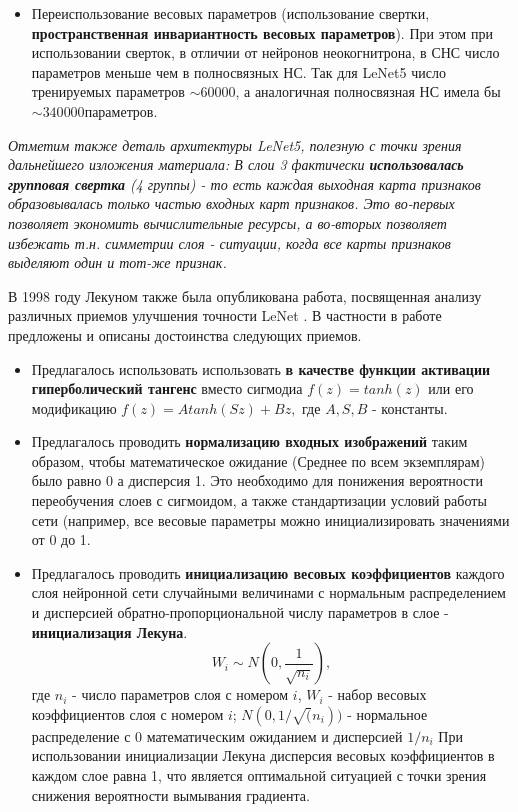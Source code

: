 \documentclass[12pt]{article}
\begin{document}
\begin{sloppypar}
\begin{itemize}
    \item Переиспользование весовых параметров (использование свертки, \textbf{пространственная инвариантность весовых параметров}). При этом при использовании сверток, в отличии от нейронов неокогнитрона, в СНС число параметров меньше чем в полносвязных НС. Так для LeNet5 число тренируемых параметров $\sim 60 000$, а аналогичная полносвязная НС имела бы $\sim 340 000 параметров$.
\end{itemize}

\textit{Отметим также деталь архитектуры LeNet5, полезную с точки зрения дальнейшего изложения материала:
В слои 3 фактически \textbf{использовалась групповая свертка} (4 группы) - то есть  каждая выходная карта признаков образовывалась только частью входных карт признаков\cite{lecun1998gradient}. Это во-первых позволяет экономить вычислительные ресурсы, а во-вторых позволяет избежать т.н. симметрии слоя - ситуации, когда все карты признаков выделяют один и тот-же признак.}


В 1998 году Лекуном также была опубликована работа, посвященная анализу различных приемов улучшения точности LeNet \cite{lecun1998efficient}. В частности в работе предложены и описаны достоинства следующих приемов. 
\begin{itemize}
    
    \item Предлагалось использовать использовать \textbf{в качестве функции активации гиперболический тангенс} вместо сигмодиа $f(z) = tanh(z)$ или его модификацию $f(z) = Atanh(Sz)+Bz,$ где $A, S, B$ - константы.
    
    \item Предлагалось проводить \textbf{нормализацию входных изображений} таким образом, чтобы математическое ожидание (Среднее по всем экземплярам) было равно 0 а дисперсия 1.  Это необходимо для понижения вероятности переобучения слоев с сигмоидом, а также стандартизации условий работы сети (например, все весовые параметры можно инициализировать значениями от 0 до 1.
    
    \item Предлагалось проводить \textbf{инициализацию весовых коэффициентов} каждого слоя нейронной сети случайными величинами с нормальным распределением и дисперсией обратно-пропорциональной числу параметров в слое - \textbf{инициализация Лекуна}.
    \begin{equation}
        \label{ch1:eqn:lecun}
        W_i \sim N\left(0,\frac{1}{\sqrt{n_i}}\right),
    \end{equation}
    где $n_i$ - число параметров слоя с номером $i$, $W_i$ - набор весовых коэффициентов слоя с номером $i$; $N(0,1/\sqrt(n_i))$ - нормальное распределение с 0 математическим ожиданием и дисперсией $1/n_i$
    При использовании инициализации Лекуна дисперсия весовых коэффициентов в каждом слое равна 1, что является оптимальной ситуацией с точки зрения снижения вероятности вымывания градиента.
    

\end{itemize}
\end{sloppypar}
\end{document}

